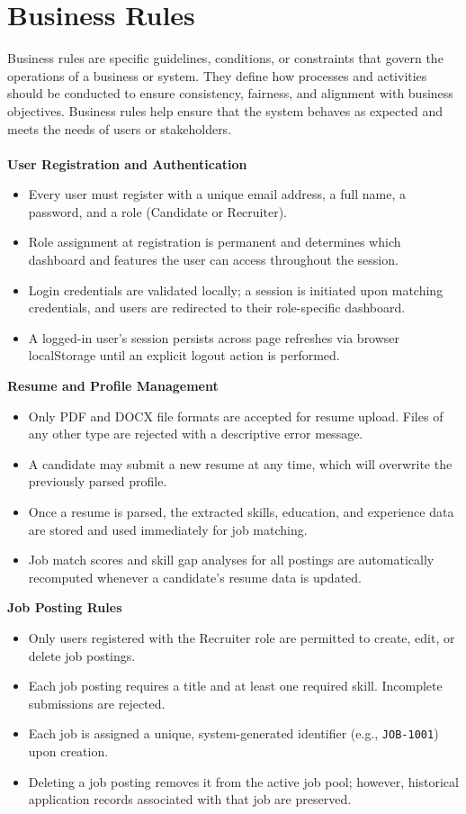 \section{Business Rules}
Business rules are specific guidelines, conditions, or constraints that govern the operations of a
business or system. They define how processes and activities should be conducted to ensure
consistency, fairness, and alignment with business objectives. Business rules help ensure that the
system behaves as expected and meets the needs of users or stakeholders.\\\\
\textbf{User Registration and Authentication}
\begin{itemize}
    \item Every user must register with a unique email address, a full name, a password, and a role (Candidate or Recruiter).
    \item Role assignment at registration is permanent and determines which dashboard and features the user can access throughout the session.
    \item Login credentials are validated locally; a session is initiated upon matching credentials, and users are redirected to their role-specific dashboard.
    \item A logged-in user's session persists across page refreshes via browser localStorage until an explicit logout action is performed.
\end{itemize}
\textbf{Resume and Profile Management}
\begin{itemize}
    \item Only PDF and DOCX file formats are accepted for resume upload. Files of any other type are rejected with a descriptive error message.
    \item A candidate may submit a new resume at any time, which will overwrite the previously parsed profile.
    \item Once a resume is parsed, the extracted skills, education, and experience data are stored and used immediately for job matching.
    \item Job match scores and skill gap analyses for all postings are automatically recomputed whenever a candidate's resume data is updated.
\end{itemize}
\textbf{Job Posting Rules}
\begin{itemize}
    \item Only users registered with the Recruiter role are permitted to create, edit, or delete job postings.
    \item Each job posting requires a title and at least one required skill. Incomplete submissions are rejected.
    \item Each job is assigned a unique, system-generated identifier (e.g., \texttt{JOB-1001}) upon creation.
    \item Deleting a job posting removes it from the active job pool; however, historical application records associated with that job are preserved.
\end{itemize}
